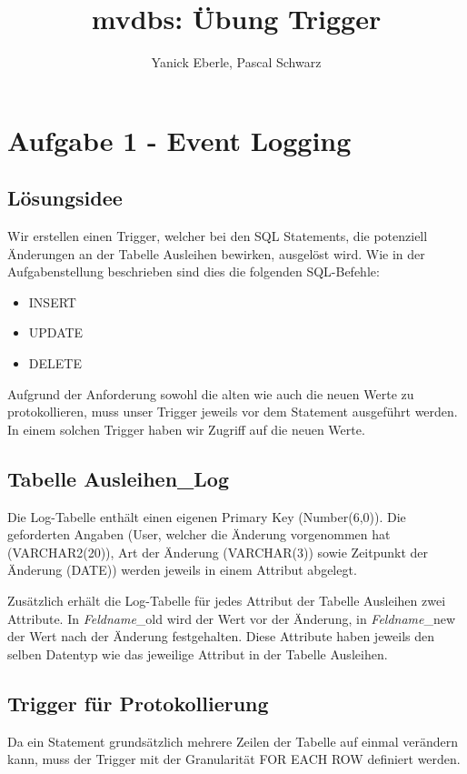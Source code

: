 \documentclass[11pt,a4paper,parskip=half]{scrartcl}
\title{mvdbs: Übung Trigger}
\author{Yanick Eberle, Pascal Schwarz}
\begin{document}
\maketitle

\section{Aufgabe 1 - Event Logging}
\subsection{Lösungsidee}
Wir erstellen einen Trigger, welcher bei den SQL Statements, die potenziell Änderungen an der Tabelle \glqq{}Ausleihen\grqq{} bewirken, ausgelöst wird. Wie in der Aufgabenstellung beschrieben sind dies die folgenden SQL-Befehle:

\begin{itemize}
	\item{INSERT}
	\item{UPDATE}
	\item{DELETE}
\end{itemize}

Aufgrund der Anforderung sowohl die alten wie auch die neuen Werte zu protokollieren, muss unser Trigger jeweils vor dem Statement ausgeführt werden. In einem solchen Trigger haben wir Zugriff auf die neuen Werte.

\subsection{Tabelle Ausleihen\_Log}
Die Log-Tabelle enthält einen eigenen Primary Key (Number(6,0)). Die geforderten Angaben (User, welcher die Änderung vorgenommen hat (VARCHAR2(20)), Art der Änderung (VARCHAR(3)) sowie Zeitpunkt der Änderung (DATE)) werden jeweils in einem Attribut abgelegt.

Zusätzlich erhält die Log-Tabelle für jedes Attribut der Tabelle Ausleihen zwei Attribute. In \emph{Feldname}\_old wird der Wert vor der Änderung, in \emph{Feldname}\_new der Wert nach der Änderung festgehalten. Diese Attribute haben jeweils den selben Datentyp wie das jeweilige Attribut in der Tabelle \glqq{}Ausleihen\grqq{}.

\subsection{Trigger für Protokollierung}
Da ein Statement grundsätzlich mehrere Zeilen der Tabelle \glqq{}auf einmal\grqq{} verändern kann, muss der Trigger mit der Granularität \glqq{}FOR EACH ROW\grqq{} definiert werden.
\end{document}
